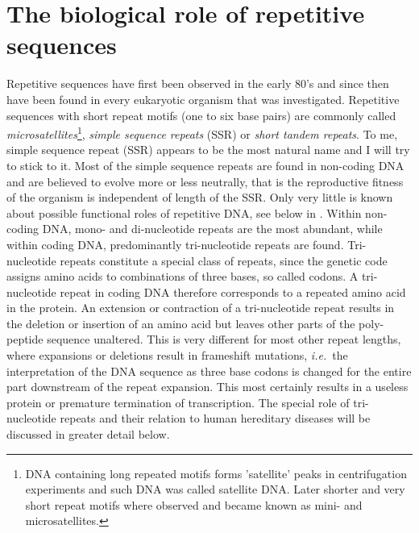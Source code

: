 \section{The biological role of repetitive sequences}
%
%
%
Repetitive sequences have first been observed in the early 80's \cite{Spritz_NAR_81} and since then 
have been found in every eukaryotic organism that was investigated. 
Repetitive sequences with short repeat motifs (one to six base pairs) are commonly 
called \emph{microsatellites}\footnote{DNA containing long repeated motifs forms 'satellite'
peaks in centrifugation experiments and such DNA was called satellite DNA. Later shorter and 
very short repeat motifs where observed and became known as mini- and microsatellites.}, 
\emph{simple sequence repeats} (SSR) or \emph{short tandem repeats}. To me, 
simple sequence repeat (SSR) appears to be the most natural name and I will try to stick to it.
Most of the simple sequence repeats are found in non-coding DNA and are believed to 
evolve more or less neutrally, that is the reproductive fitness of the organism is independent of length of the SSR. 
Only very little is known about possible functional roles of repetitive DNA, see below in . 
Within non-coding DNA, mono- and di-nucleotide repeats are
the most abundant, while within coding DNA, predominantly tri-nucleotide repeats are found.
Tri-nucleotide repeats constitute a special class of repeats, since the genetic code assigns amino acids to combinations of three bases, so called codons. 
%
A tri-nucleotide repeat in coding DNA therefore corresponds to 
a repeated amino acid in the protein. An extension or contraction of a tri-nucleotide repeat
results in the deletion or insertion of an amino acid but leaves other parts of the poly-peptide sequence 
unaltered. This is very different for most other repeat lengths, where expansions or deletions
result in frameshift mutations, \emph{i.e.~}the interpretation of the DNA sequence as three base
codons is changed for the entire part downstream of the repeat expansion. 
This most certainly results in a useless protein or premature termination of transcription. 
The special role of tri-nucleotide repeats and their 
relation to human hereditary diseases will be discussed in greater detail below.

